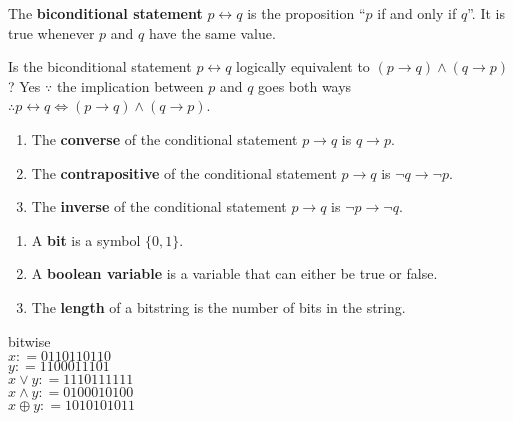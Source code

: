 \documentclass[a4paper, 12pt]{article}
\newenvironment{proof}[1][Proof]{\begin{trivlist}
\item[\hskip \labelsep {\bfseries #1}]}{\end{trivlist}}
\newenvironment{definition}[1][Definition]{\begin{trivlist}
\item[\hskip \labelsep {\bfseries #1}]}{\end{trivlist}}
\newenvironment{example}[1][Example]{\begin{trivlist}
\item[\hskip \labelsep {\bfseries #1}]}{\end{trivlist}}
\newcommand{\keyword}[1]{\textbf{#1}}
\begin{document}
    \begin{definition}
        The \keyword{biconditional statement} $p \leftrightarrow q$
        is the proposition ``$p$ if and only if $q$''.
        It is true whenever $p$ and $q$ have the same value.
    \end{definition}
    \begin{proof}
        Is the biconditional statement $p \leftrightarrow q$ logically
        equivalent to $(p \rightarrow q) \wedge (q \rightarrow p)$?
        Yes $\because$ the implication between $p$ and $q$ goes both ways
        $\therefore p \leftrightarrow q \iff (p \rightarrow q) \wedge
        (q \rightarrow p)$.
    \end{proof}
    \begin{definition}
        \hfill
        \begin{enumerate}
            \item The \keyword{converse} of the conditional statement
            $p \rightarrow q$ is $q \rightarrow p$.
            \item The \keyword{contrapositive} of the conditional statement
            $p \rightarrow q$ is $\neg q \rightarrow \neg p$.
            \item The \keyword{inverse} of the conditional statement
            $p \rightarrow q$ is $\neg p \rightarrow \neg q$.
        \end{enumerate}
    \end{definition}
    \begin{definition}
        \hfill
        \begin{enumerate}
            \item A \keyword{bit} is a symbol $\{0, 1\}$.
            \item A \keyword{boolean variable} is a variable that can
            either be true or false.
            \item The \keyword{length} of a bitstring is the number
            of bits in the string.
        \end{enumerate}
    \end{definition}
    \begin{example}
        bitwise\\
        $x: = 01 1011 0110$\\
        $y: = 11 0001 1101$\\
        $x \vee y: = 11 1011 1111$\\
        $x \wedge y: = 01 0001 0100$\\
        $x \oplus y: = 10 1010 1011$\\
    \end{example}
\end{document}
